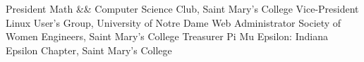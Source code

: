\begin{cvskills}
\cvskill
  {President}
  {Math \&\& Computer Science Club, Saint Mary's College}
\cvskill
  {Vice-President}
  {Linux User's Group, University of Notre Dame}
\cvskill
  {Web Administrator}
  {Society of Women Engineers, Saint Mary's College}
\cvskill
  {Treasurer}
  {Pi Mu Epsilon: Indiana Epsilon Chapter, Saint Mary's College}
\end{cvskills}
